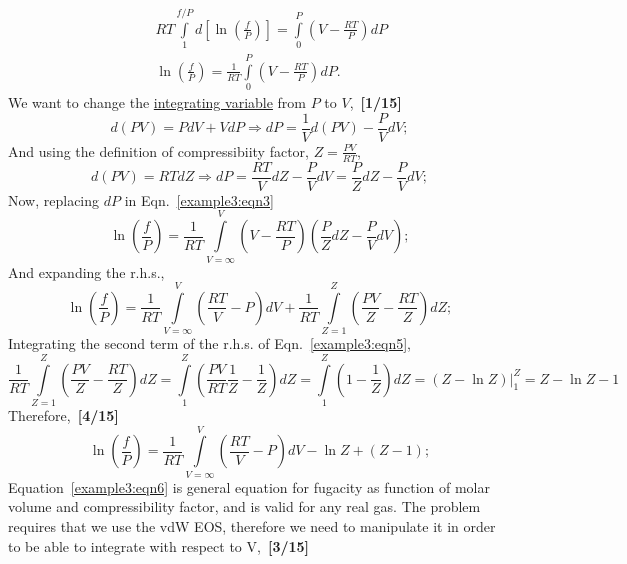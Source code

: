 \documentclass[12pts,a4paper,amsmath,amssymb,floatfix]{article}%
\newcommand{\frc}{\displaystyle\frac}
\begin{document}
\begin{enumerate}[label=\bfseries Problem \arabic*]
{\begin{enumerate}
\begin{eqnarray}
           && RT\int\limits_{1}^{f/P}d\left[\ln\left(\frc{f}{P}\right)\right] = \int\limits_{0}^{P}\left(V-\frc{RT}{P}\right)dP \nonumber \\
           && \ln\left(\frc{f}{P}\right) = \frc{1}{RT} \int\limits_{0}^{P}\left(V-\frc{RT}{P}\right)dP.\label{example3:eqn3}
      \end{eqnarray}
       We want to change the \underline{integrating variable} from $P$ to $V$,~\hfill{\bf [1/15]}
      \begin{displaymath}
         d(PV) = PdV + VdP \Longrightarrow dP = \frc{1}{V}d(PV) - \frc{P}{V}dV;
      \end{displaymath}
      And using the definition of compressibiity factor, $Z=\frc{PV}{RT}$,
       \begin{displaymath}
          d(PV) = RT dZ \Longrightarrow dP = \frc{RT}{V}dZ - \frc{P}{V}dV = \frc{P}{Z}dZ - \frc{P}{V}dV;
       \end{displaymath}
      Now, replacing $dP$ in Eqn.~\ref{example3:eqn3}
       \begin{equation}
          \ln\left(\frc{f}{P}\right) = \frc{1}{RT} \int\limits_{V=\infty}^{V}\left(V-\frc{RT}{P}\right)\left(\frc{P}{Z}dZ-\frc{P}{V}dV\right)\label{example3:eqn4};
       \end{equation}
       And expanding the r.h.s., 
       \begin{equation}
          \ln\left(\frc{f}{P}\right) = \frc{1}{RT} \int\limits_{V=\infty}^{V}\left(\frc{RT}{V}-P\right)dV + \frc{1}{RT}\int\limits_{Z=1}^{Z}\left(\frc{PV}{Z}-\frc{RT}{Z}\right)dZ;\label{example3:eqn5}
       \end{equation}
        Integrating the second term of the r.h.s. of Eqn.~\ref{example3:eqn5},
       \begin{displaymath}
           \frc{1}{RT}\int\limits_{Z=1}^{Z}\left(\frc{PV}{Z}-\frc{RT}{Z}\right)dZ = \int\limits_{1}^{Z}\left(\frc{PV}{RT}\frc{1}{Z}-\frc{1}{Z}\right)dZ = \int\limits_{1}^{Z}\left(1 -\frc{1}{Z}\right)dZ = \left.\left(Z - \ln Z\right)\right|_{1}^{Z} = Z- \ln Z - 1
       \end{displaymath}
        Therefore,~\hfill{\bf [4/15]}
       \begin{equation}
          \ln\left(\frc{f}{P}\right) = \frc{1}{RT} \int\limits_{V=\infty}^{V}\left(\frc{RT}{V}-P\right)dV - \ln Z + \left(Z - 1\right);\label{example3:eqn6}
       \end{equation}
       Equation~\ref{example3:eqn6} is general equation for fugacity as function of molar volume and compressibility factor, and is valid for any real gas. The problem requires that we use the vdW EOS, therefore we need to manipulate it in order to be able to integrate with respect to V,~\hfill{\bf [3/15]}

\end{enumerate}}
\end{enumerate}
\end{document}
